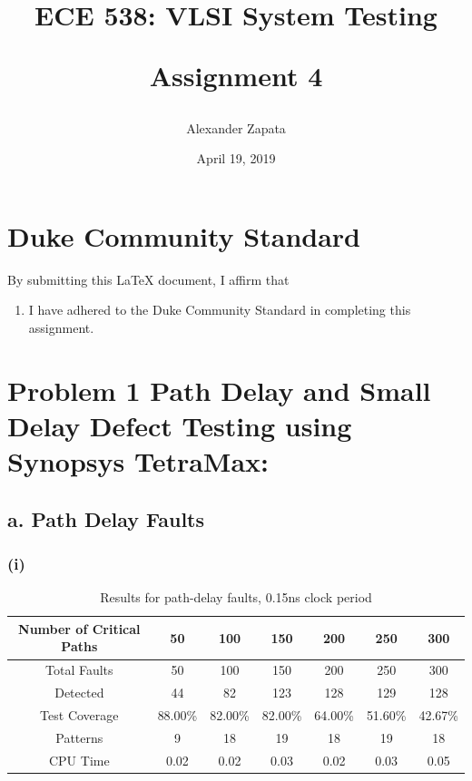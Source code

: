 \documentclass[letterpaper]{article} %
\begin{document}
\title{ECE 538: VLSI System Testing\\
\begin{large}{Assignment 4}\end{large}
\date{April 19, 2019}} %
\author{Alexander Zapata}
\maketitle


\vspace{12.0cm}
\section*{Duke Community Standard}

By submitting this \LaTeX{} document, I affirm that
\begin{enumerate}
    \item I have adhered to the Duke Community Standard in completing this assignment.
\end{enumerate}

\newpage 

\section*{Problem 1 {\small Path	Delay	and	Small	Delay	Defect	Testing	using	Synopsys	TetraMax:}}
\subsection*{a. Path Delay Faults}
\subsubsection*{(i)}

\begin{table}[ht]
\centering
\begin{tabular}{|c|c|c|c|c|c|c|}
\hline
Number of Critical Paths & 50      & 100     & 150     & 200     & 250     & 300     \\ \hline
Total Faults             & 50      & 100     & 150     & 200     & 250     & 300     \\ \hline
Detected                 & 44      & 82      & 123     & 128     & 129     & 128     \\ \hline
Test Coverage            & 88.00\% & 82.00\% & 82.00\% & 64.00\% & 51.60\% & 42.67\% \\ \hline
Patterns                 & 9       & 18      & 19      & 18      & 19      & 18      \\ \hline
CPU Time                 & 0.02    & 0.02    & 0.03    & 0.02    & 0.03    & 0.05    \\ \hline
\end{tabular}
\caption{Results for path-delay faults, 0.15ns clock period}
\end{table}
\end{document}
